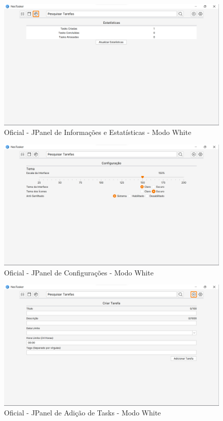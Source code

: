 \documentclass[a4paper,12pt]{article}
\begin{document}
\begin{figure}[H]
	\centering
	\includegraphics[scale=0.19]{prototypes/oficial_white/stats.png}
	\caption{Oficial - JPanel de Informações e Estatísticas - Modo White}
\end{figure}

\begin{figure}[H]
	\centering
	\includegraphics[scale=0.19]{prototypes/oficial_white/config.png}
	\caption{Oficial - JPanel de Configurações - Modo White}
\end{figure}

\pagebreak

\begin{figure}[H]
	\centering
	\includegraphics[scale=0.19]{prototypes/oficial_white/create.png}
	\caption{Oficial - JPanel de Adição de Tasks - Modo White}
\end{figure}
\end{document}
